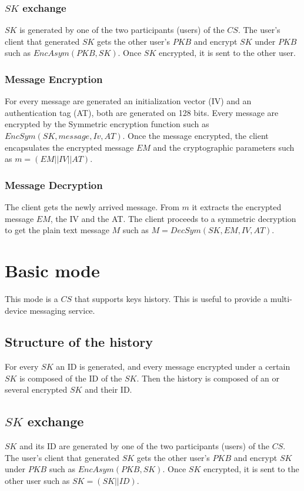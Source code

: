 \documentclass[a4paper,10pt]{article}
\begin{document}
\subsubsection{$SK$ exchange}
$SK$ is generated by one of the two participants (users) of the $CS$. The user's client that generated $SK$ gets the other user's $PKB$ and encrypt $SK$ under $PKB$ such as $EncAsym(PKB, SK)$. Once $SK$ encrypted, it is sent to the other user.
\subsubsection{Message Encryption}
For every message are generated an initialization vector (IV) and an authentication tag (AT), both are generated on 128 bits. Every message are encrypted by the Symmetric encryption function such as $EncSym(SK,message,Iv, AT)$. Once the message encrypted, the client encapsulates the encrypted message $EM$ and the cryptographic parameters such as $m=(EM||IV||AT)$.

\subsubsection{Message Decryption}
The client gets the newly arrived message. From $m$ it extracts the encrypted message $EM$, the IV and the AT. The client proceeds to a symmetric decryption to get the plain text message $M$ such as $M=DecSym(SK, EM, IV, AT)$.

\section{Basic mode}
This mode is a $CS$ that supports keys history. This is useful to provide a multi-device messaging service.
\subsection{Structure of the history}
For every $SK$ an ID is generated, and every message encrypted under a certain $SK$ is composed of the ID of the $SK$. Then the history is composed of an or several encrypted $SK$ and their ID.
\subsection{$SK$ exchange}
$SK$ and its ID are generated by one of the two participants (users) of the $CS$. The user's client that generated $SK$ gets the other user's $PKB$ and encrypt $SK$ under $PKB$ such as $EncAsym(PKB, SK)$. Once $SK$ encrypted, it is sent to the other user such as $SK=(SK||ID)$.
\end{document}
